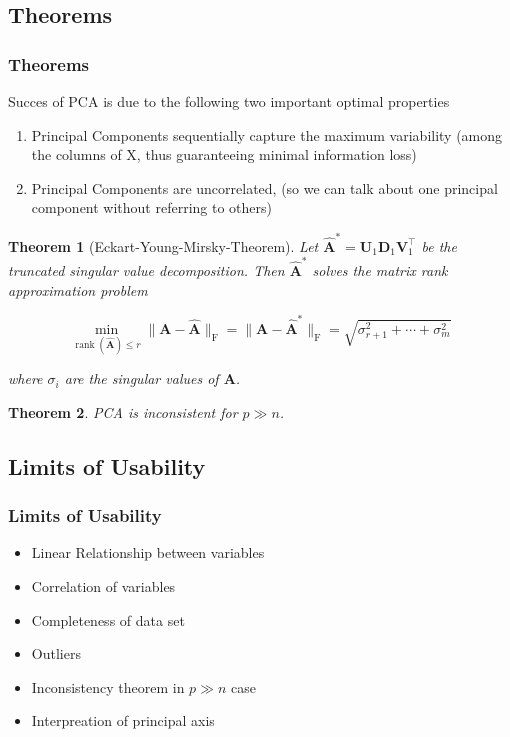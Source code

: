 \documentclass{beamer}
\theoremstyle{plain}
\newtheorem{thm}{Theorem}
\theoremstyle{definition}
\newcommand{\mat}[1]{\mathbf{#1}}
\begin{document}
\subsection{Theorems}

\begin{frame}
\frametitle{Theorems}
Succes of PCA is due to the following two important optimal properties
\begin{enumerate}
\item Principal Components sequentially capture the maximum variability (among the columns of X, thus guaranteeing minimal information loss)
\item Principal Components are uncorrelated, (so we can talk about one principal component without referring to others)
\end{enumerate}
\end{frame}

\begin{frame}
\begin{thm}[Eckart-Young-Mirsky-Theorem]
Let $\widehat{\mat{A}}^* = \mat{U}_1 \mat{D}_1 \mat{V}_1^{\top}$
be the \textit{truncated singular value decomposition}. Then $\widehat{ \mat{A}}^*$ solves the matrix rank approximation problem

$$\min_{\operatorname{rank}(\widehat{\mat{A}}) \leq r} \|\mat{A}-\widehat{\mat{A}}\|_{\text{F}} = \|\mat{A}-\widehat{\mat{A}}^*\|_{\text{F}} = \sqrt{\sigma^2_{r+1} + \cdots + \sigma^2_m}$$

where $\sigma_i$ are the singular values of $\mat A$.
\end{thm}
\end{frame}

\begin{frame}
\begin{thm}
PCA is inconsistent for $p \gg n$.
\end{thm}
\end{frame}




\subsection{Limits of Usability}
\begin{frame}
\frametitle{Limits of Usability}
\begin{itemize}
\item Linear Relationship between variables
\item Correlation of variables
\item Completeness of data set
\item Outliers
\item Inconsistency theorem in $p \gg n$ case
\item Interpreation of principal axis
\end{itemize}


\end{frame}
\end{document}
